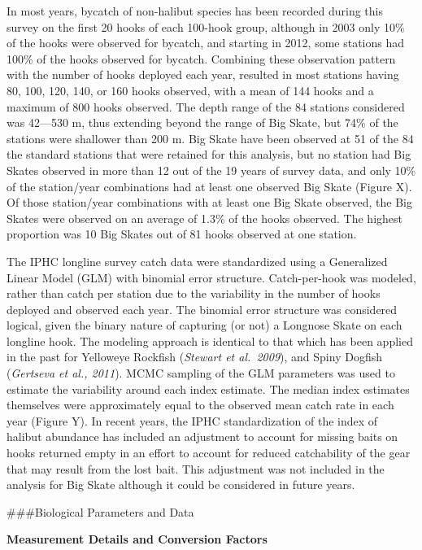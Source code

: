 \documentclass[12pt,]{article}
\begin{document}
In most years, bycatch of non-halibut species has been recorded during
this survey on the first 20 hooks of each 100-hook group, although in
2003 only 10\% of the hooks were observed for bycatch, and starting in
2012, some stations had 100\% of the hooks observed for bycatch.
Combining these observation pattern with the number of hooks deployed
each year, resulted in most stations having 80, 100, 120, 140, or 160
hooks observed, with a mean of 144 hooks and a maximum of 800 hooks
observed. The depth range of the 84 stations considered was 42---530 m,
thus extending beyond the range of Big Skate, but 74\% of the stations
were shallower than 200 m. Big Skate have been observed at 51 of the 84
the standard stations that were retained for this analysis, but no
station had Big Skates observed in more than 12 out of the 19 years of
survey data, and only 10\% of the station/year combinations had at least
one observed Big Skate (Figure X). Of those station/year combinations
with at least one Big Skate observed, the Big Skates were observed on an
average of 1.3\% of the hooks observed. The highest proportion was 10
Big Skates out of 81 hooks observed at one station.

The IPHC longline survey catch data were standardized using a
Generalized Linear Model (GLM) with binomial error structure.
Catch-per-hook was modeled, rather than catch per station due to the
variability in the number of hooks deployed and observed each year. The
binomial error structure was considered logical, given the binary nature
of capturing (or not) a Longnose Skate on each longline hook. The
modeling approach is identical to that which has been applied in the
past for Yelloweye Rockfish (\emph{Stewart et al.~2009}), and Spiny
Dogfish (\emph{Gertseva et al., 2011}). MCMC sampling of the GLM
parameters was used to estimate the variability around each index
estimate. The median index estimates themselves were approximately equal
to the observed mean catch rate in each year (Figure Y). In recent
years, the IPHC standardization of the index of halibut abundance has
included an adjustment to account for missing baits on hooks returned
empty in an effort to account for reduced catchability of the gear that
may result from the lost bait. This adjustment was not included in the
analysis for Big Skate although it could be considered in future years.
\newpage

\#\#\#Biological Parameters and Data

\textbf{Measurement Details and Conversion Factors}
\end{document}
